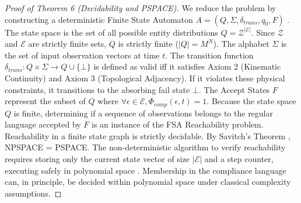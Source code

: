 \documentclass[conference]{IEEEtran}
\newcommand{\E}{\mathcal{E}} %
\newcommand{\Z}{\mathcal{Z}} %
\newcommand{\fail}{\bot} %
\begin{document}
\begin{proof}[Proof of Theorem 6 (Decidability and PSPACE)]
We reduce the problem by constructing a deterministic Finite State Automaton $A = (Q, \Sigma, \delta_{trans}, q_0, F)$ \cite{b5}. The state space is the set of all possible entity distributions $Q = \Z^{|\E|}$. Since $\Z$ and $\E$ are strictly finite sets, $Q$ is strictly finite ($|Q| = M^N$). The alphabet $\Sigma$ is the set of input observation vectors at time $t$. The transition function $\delta_{trans}: Q \times \Sigma \to Q \cup \{\fail\}$ is defined as valid iff it satisfies Axiom 2 (Kinematic Continuity) and Axiom 3 (Topological Adjacency). If it violates these physical constraints, it transitions to the absorbing fail state $\fail$. The Accept States $F$ represent the subset of $Q$ where $\forall \epsilon \in \E, \Phi_{comp}(\epsilon, t) = 1$. Because the state space $Q$ is finite, determining if a sequence of observations belongs to the regular language accepted by $F$ is an instance of the FSA Reachability problem. Reachability in a finite state graph is strictly decidable. By Savitch's Theorem \cite{b7}, NPSPACE = PSPACE. The non-deterministic algorithm to verify reachability requires storing only the current state vector of size $|\E|$ and a step counter, executing safely in polynomial space \cite{b23}. Membership in the compliance language can, in principle, be decided within polynomial space under classical complexity assumptions.
\end{proof}
\end{document}
